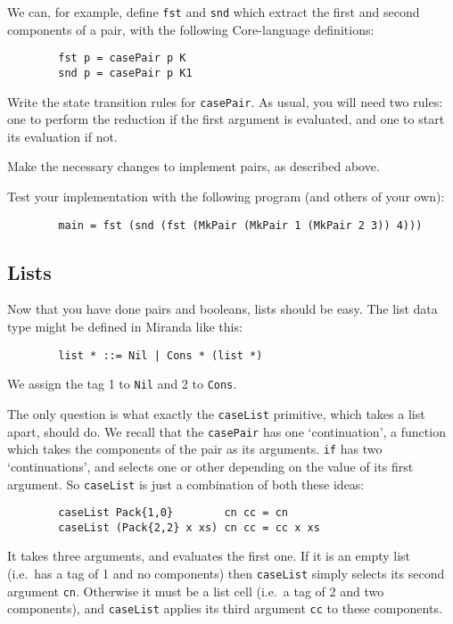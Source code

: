 We can, for example, define \mbox{\tt fst} and \mbox{\tt snd} which extract the
first and second components of a pair, with the following Core-language
definitions:
\begin{verbatim}
        fst p = casePair p K
        snd p = casePair p K1
\end{verbatim}

\begin{exercise}
Write the state transition rules for \mbox{\tt casePair}.  As usual, you will need
two rules: one to perform the reduction if the first argument is evaluated,
and one to start its evaluation if not.

Make the necessary changes to implement pairs, as described above.

Test your implementation with the following program (and others of your own):
\begin{verbatim}
        main = fst (snd (fst (MkPair (MkPair 1 (MkPair 2 3)) 4)))
\end{verbatim}
\end{exercise}

\subsection{Lists}

Now that you have done pairs and booleans, lists should be easy.
The list data type might be defined in Miranda like this:
\begin{verbatim}
        list * ::= Nil | Cons * (list *)
\end{verbatim}
We assign the tag 1 to \mbox{\tt Nil} and 2 to \mbox{\tt Cons}.

The only question is what exactly
the \mbox{\tt caseList} primitive, which takes a list apart, should do.
We recall that the \mbox{\tt casePair} has one `continuation', a function which
takes the components
of the pair as its arguments.  \mbox{\tt if} has two `continuations', and selects one
or other depending on the value of its first argument.
So \mbox{\tt caseList} is just a combination of both these ideas:
\begin{verbatim}
        caseList Pack{1,0}        cn cc = cn
        caseList (Pack{2,2} x xs) cn cc = cc x xs
\end{verbatim}
It takes three arguments, and evaluates the first one.  If it is an empty
list (i.e.\ has a tag
of 1 and no components) then \mbox{\tt caseList} simply selects its second argument \mbox{\tt cn}.
Otherwise it must be a list cell (i.e.\ a tag of 2 and two components), and
\mbox{\tt caseList} applies its third argument \mbox{\tt cc} to these components.

